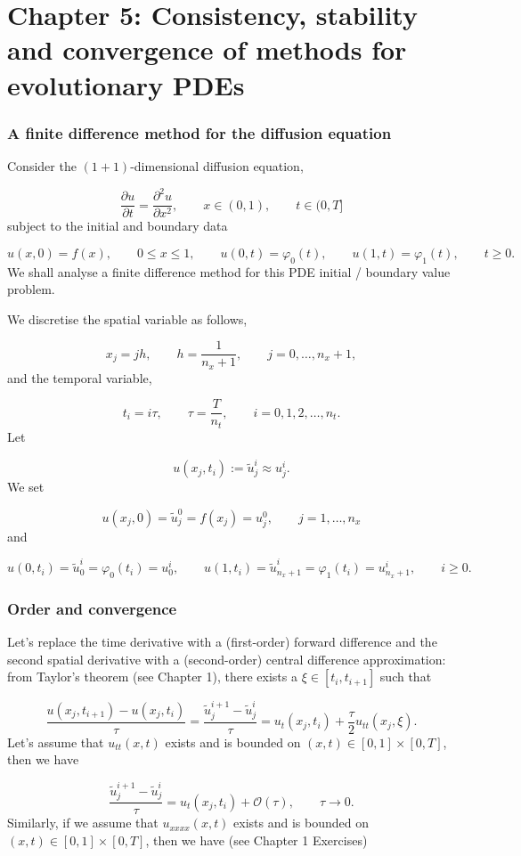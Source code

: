 \documentclass[12pt,a4paper]{article}
\begin{document}
\section{Chapter 5: Consistency, stability and convergence of methods for evolutionary PDEs}
\subsubsection{A finite difference method for the diffusion equation}
Consider the $(1+1)$-dimensional diffusion equation,

\[
\frac{\partial u}{\partial t}=\frac{\partial^2 u}{\partial x^2}, \qquad x \in (0, 1),\qquad t \in (0, T]
\]
subject to the initial and boundary data

\[
u(x,0) = f(x), \qquad 0 \leq x \leq 1, \qquad u(0,t) = \varphi_0(t), \qquad u(1,t) = \varphi_1(t), \qquad t \geq 0.
\]
We shall analyse a finite difference method for this PDE initial / boundary value problem.

We discretise the spatial variable as follows,

\[
x_j = j h, \qquad h = \frac{1}{n_x + 1}, \qquad j = 0, \ldots, n_x + 1,
\]
and the temporal variable,

\[
t_i = i\tau, \qquad \tau = \frac{T}{n_t}, \qquad i = 0, 1, 2, \ldots, n_t.
\]
Let 

\[
u(x_j, t_i) := \tilde{u}^i_j \approx u^{i}_j.
\]
We set

\[
u(x_j, 0) = \tilde{u}^0_j =  f(x_j) =  u^{0}_j, \qquad j = 1, \ldots, n_x
\]
and

\[
u(0,t_i)  = \tilde{u}^i_0 = \varphi_0(t_i) =  u^i_0, \qquad u(1,t_i) =  \tilde{u}^i_{n_x + 1} = \varphi_1(t_i) =  u^i_{n_x +1}, \qquad i \geq 0.
\]
\subsubsection{Order and convergence}
Let's replace the time derivative with a (first-order) forward difference and the second spatial derivative with a (second-order) central difference approximation: from Taylor's theorem (see Chapter 1), there exists a $\xi \in [t_i, t_{i+1}]$ such that

\[
\frac{u(x_j,t_{i+1}) - u(x_j,t_{i})}{\tau} =\frac{\tilde{u}^{i+1}_j - \tilde{u}^i_j}{\tau} = u_t(x_j,t_i) + \frac{\tau}{2}u_{tt}(x_j,\xi).
\]
Let's assume that $u_{tt}(x,t)$ exists and is bounded on $(x,t) \in [0,1]\times[0,T]$, then we have

\[
\frac{\tilde{u}^{i+1}_j - \tilde{u}^i_j}{\tau} = u_t(x_j,t_i) + \mathcal{O}(\tau), \qquad \tau \to 0.
\]
Similarly, if we assume that $u_{xxxx}(x,t)$ exists and is bounded on $(x,t) \in [0,1]\times[0,T]$, then we have (see Chapter 1 Exercises)
\end{document}
